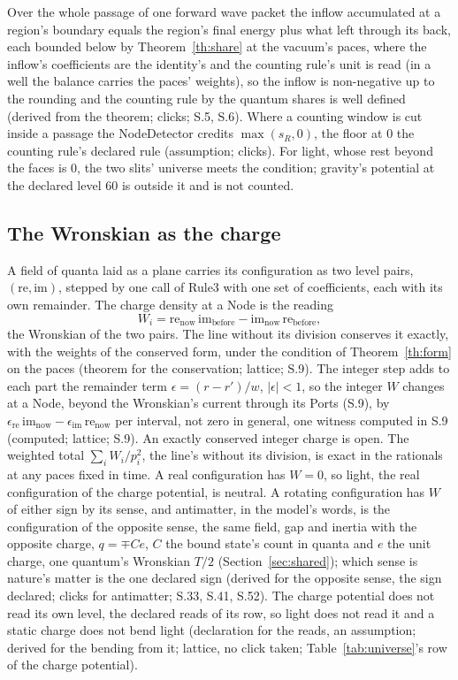 \documentclass[pdflatex,sn-mathphys-num]{sn-jnl}
\theoremstyle{thmstyleone}
\theoremstyle{thmstyletwo}
\begin{document}
Over the whole passage of one forward wave packet the inflow accumulated at a region's boundary equals the region's final energy plus what left through its back, each bounded below by Theorem~\ref{th:share} at the vacuum's paces, where the inflow's coefficients are the identity's and the counting rule's unit is read (in a well the balance carries the paces' weights), so the inflow is non-negative up to the rounding and the counting rule by the quantum shares is well defined (derived from the theorem; clicks; S.5, S.6). Where a counting window is cut inside a passage the NodeDetector credits $\max(s_R, 0)$, the floor at $0$ the counting rule's declared rule (assumption; clicks). For light, whose rest beyond the faces is $0$, the two slits' universe meets the condition; gravity's potential at the declared level $60$ is outside it and is not counted.

\subsection{The Wronskian as the charge}\label{sec:sign}

A field of quanta laid as a plane carries its configuration as two level pairs, $(\mathrm{re}, \mathrm{im})$, stepped by one call of Rule3 with one set of coefficients, each with its own remainder. The charge density at a Node is the reading
\begin{equation}\label{eq:wronskian}
\boxed{W_i = \mathrm{re}_{\mathrm{now}}\,\mathrm{im}_{\mathrm{before}} - \mathrm{im}_{\mathrm{now}}\,\mathrm{re}_{\mathrm{before}}},
\end{equation}
the Wronskian of the two pairs. The line without its division conserves it exactly, with the weights of the conserved form, under the condition of Theorem~\ref{th:form} on the paces (theorem for the conservation; lattice; S.9). The integer step adds to each part the remainder term $\epsilon = (r - r') / w$, $|\epsilon| < 1$, so the integer $W$ changes at a Node, beyond the Wronskian's current through its Ports (S.9), by $\epsilon_{\mathrm{re}}\,\mathrm{im}_{\mathrm{now}} - \epsilon_{\mathrm{im}}\,\mathrm{re}_{\mathrm{now}}$ per interval, not zero in general, one witness computed in S.9 (computed; lattice; S.9). An exactly conserved integer charge is open. The weighted total $\sum_i W_i / p_i^2$, the line's without its division, is exact in the rationals at any paces fixed in time. A real configuration has $W = 0$, so light, the real configuration of the charge potential, is neutral. A rotating configuration has $W$ of either sign by its sense, and antimatter, in the model's words, is the configuration of the opposite sense, the same field, gap and inertia with the opposite charge, $q = \mp Ce$, $C$ the bound state's count in quanta and $e$ the unit charge, one quantum's Wronskian $T / 2$ (Section~\ref{sec:shared}); which sense is nature's matter is the one declared sign (derived for the opposite sense, the sign declared; clicks for antimatter; S.33, S.41, S.52). The charge potential does not read its own level, the declared reads of its row, so light does not read it and a static charge does not bend light (declaration for the reads, an assumption; derived for the bending from it; lattice, no click taken; Table~\ref{tab:universe}'s row of the charge potential).
\end{document}
